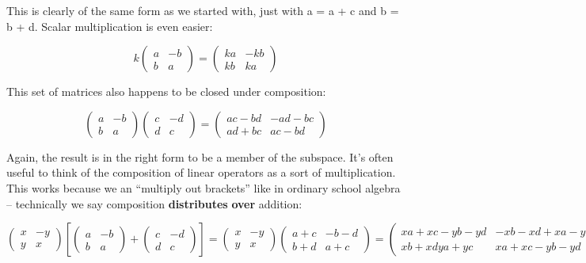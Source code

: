 \documentclass[oneside,english]{amsbook}
\numberwithin{section}{chapter}
\theoremstyle{plain}
\theoremstyle{definition}
\begin{document}
This is clearly of the same form as we started with, just with a = a + c
and b = b + d. Scalar multiplication is even easier:

\[k\begin{pmatrix}
	a & - b \\
	b & a
\end{pmatrix} = \begin{pmatrix}
	ka & - kb \\
	kb & ka
\end{pmatrix}\]

This set of matrices also happens to be closed under composition:

\[\begin{pmatrix}
	a & - b \\
	b & a
\end{pmatrix}\begin{pmatrix}
	c & - d \\
	d & c
\end{pmatrix} = \begin{pmatrix}
	ac - bd & - ad - bc \\
	ad + bc & ac - bd
\end{pmatrix}\]

Again, the result is in the right form to be a member of the subspace.
It's often useful to think of the composition of linear operators as a
sort of multiplication. This works because we an ``multiply out
brackets'' like in ordinary school algebra -- technically we say
composition \textbf{distributes} \textbf{over} addition:

\[{\begin{pmatrix}
		x & - y \\
		y & x
	\end{pmatrix}\left\lbrack \begin{pmatrix}
		a & - b \\
		b & a
	\end{pmatrix} + \begin{pmatrix}
		c & - d \\
		d & c
	\end{pmatrix} \right\rbrack = \begin{pmatrix}
		x & - y \\
		y & x
	\end{pmatrix}\begin{pmatrix}
		a + c & - b - d \\
		b + d & a + c
	\end{pmatrix}
}{= \begin{pmatrix}
		xa + xc - yb - yd & - xb - xd + xa - yc \\
		xb + xdya + yc & xa + xc - yb - yd
\end{pmatrix}}\]
\end{document}
